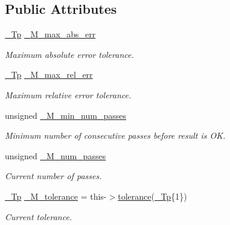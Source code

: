 \subsection*{Public Attributes}
\begin{DoxyCompactItemize}
\item 
\hyperlink{namespace____gnu__cxx_a3b19a9c800ca194374ef9172290f7d79}{\+\_\+\+Tp} \hyperlink{struct____gnu__cxx_1_1error__tolerance__t_a55773fc8e99f5906ba9a2b2f03a141fb}{\+\_\+\+M\+\_\+max\+\_\+abs\+\_\+err}
\begin{DoxyCompactList}\small\item\em Maximum absolute error tolerance. \end{DoxyCompactList}\item 
\hyperlink{namespace____gnu__cxx_a3b19a9c800ca194374ef9172290f7d79}{\+\_\+\+Tp} \hyperlink{struct____gnu__cxx_1_1error__tolerance__t_add7d7bfa6c6f5c36f50dde1497486e9e}{\+\_\+\+M\+\_\+max\+\_\+rel\+\_\+err}
\begin{DoxyCompactList}\small\item\em Maximum relative error tolerance. \end{DoxyCompactList}\item 
unsigned \hyperlink{struct____gnu__cxx_1_1error__tolerance__t_a395bb8004b293af143b531ec6de046f0}{\+\_\+\+M\+\_\+min\+\_\+num\+\_\+passes}
\begin{DoxyCompactList}\small\item\em Minimum number of consecutive passes before result is OK. \end{DoxyCompactList}\item 
unsigned \hyperlink{struct____gnu__cxx_1_1error__tolerance__t_aa3f36e75dc6dd3c6d8283ffa18f78056}{\+\_\+\+M\+\_\+num\+\_\+passes}
\begin{DoxyCompactList}\small\item\em Current number of passes. \end{DoxyCompactList}\item 
\hyperlink{namespace____gnu__cxx_a3b19a9c800ca194374ef9172290f7d79}{\+\_\+\+Tp} \hyperlink{struct____gnu__cxx_1_1error__tolerance__t_a261304757b9ff28304ee94d67405b2a6}{\+\_\+\+M\+\_\+tolerance} = this-\/$>$\hyperlink{struct____gnu__cxx_1_1error__tolerance__t_a2564721b5a7aae5f2a74703dd4c5248a}{tolerance}(\hyperlink{namespace____gnu__cxx_a3b19a9c800ca194374ef9172290f7d79}{\+\_\+\+Tp}\{1\})
\begin{DoxyCompactList}\small\item\em Current tolerance. \end{DoxyCompactList}\end{DoxyCompactItemize}



